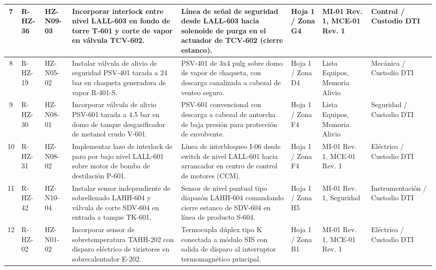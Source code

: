 \documentclass[10pt,letterpaper]{article}
\begin{document}
\begin{table}[H]
\begin{tabularx}{\textwidth}{|c|l|l|X|X|p{1.8cm}|p{2.2cm}|p{2.0cm}|}
7 & R-HZ-36 & HZ-N09-03 & Incorporar interlock entre nivel LALL-603 en fondo de torre T-601 y corte de vapor en válvula TCV-602. & Línea de señal de seguridad desde LALL-603 hacia solenoide de purga en el actuador de TCV-602 (cierre estanco). & Hoja 1 / Zona G4 & MI-01 Rev. 1, MCE-01 Rev. 1 & Control / Custodio DTI \\ \hline
8 & R-HZ-19 & HZ-N05-02 & Instalar válvula de alivio de seguridad PSV-401 tarada a 24 bar en chaqueta generadora de vapor R-401-S. & PSV-401 de 3x4 pulg sobre domo de vapor de chaqueta, con descarga canalizada a cabezal de venteo seguro. & Hoja 1 / Zona D4 & Lista Equipos, Memoria Alivio & Mecánica / Custodio DTI \\ \hline
9 & R-HZ-30 & HZ-N08-01 & Incorporar válvula de alivio PSV-601 tarada a 4.5 bar en domo de tanque desgasificador de metanol crudo V-601. & PSV-601 convencional con descarga a cabezal de antorcha de baja presión para protección de envolvente. & Hoja 1 / Zona F4 & Lista Equipos, Memoria Alivio & Seguridad / Custodio DTI \\ \hline
10 & R-HZ-31 & HZ-N08-02 & Implementar lazo de interlock de paro por bajo nivel LALL-601 sobre motor de bomba de destilación P-601. & Línea de interbloqueo I-06 desde switch de nivel LALL-601 hacia arrancador en centro de control de motores (CCM). & Hoja 1 / Zona F4 & MI-01 Rev. 1, MCE-01 Rev. 1 & Eléctrico / Custodio DTI \\ \hline
11 & R-HZ-42 & HZ-N10-04 & Instalar sensor independiente de sobrellenado LAHH-604 y válvula de corte SDV-604 en entrada a tanque TK-601. & Sensor de nivel puntual tipo diapasón LAHH-604 comandando cierre estanco de SDV-604 en línea de producto S-604. & Hoja 1 / Zona H5 & MI-01 Rev. 1, Seguridad & Instrumentación / Custodio DTI \\ \hline
12 & R-HZ-02 & HZ-N01-02 & Incorporar sensor de sobretemperatura TAHH-202 con disparo eléctrico de tiristores en sobrecalentador E-202. & Termocupla dúplex tipo K conectada a módulo SIS con salida de disparo al interruptor termomagnético principal. & Hoja 1 / Zona B1 & MI-01 Rev. 1, MCE-01 Rev. 1 & Eléctrico / Custodio DTI \\ \hline
\end{tabularx}
\end{table}
\newpage
\end{document}
